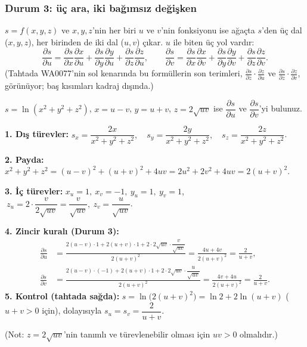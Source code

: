\subsubsection{Durum 3: üç ara, iki bağımsız değişken}
$s=f(x,y,z)$ ve $x,y,z$'nin her biri $u$ ve $v$'nin fonksiyonu ise ağaçta $s$'den üç dal ($x,y,z$), her birinden de iki
dal ($u,v$) çıkar. $u$ ile biten üç yol vardır:
\[
\frac{\partial s}{\partial u}=\frac{\partial s}{\partial x}\frac{\partial x}{\partial u}+\frac{\partial s}{\partial y}\frac{\partial y}{\partial u}+\frac{\partial s}{\partial z}\frac{\partial z}{\partial u},\qquad
\frac{\partial s}{\partial v}=\frac{\partial s}{\partial x}\frac{\partial x}{\partial v}+\frac{\partial s}{\partial y}\frac{\partial y}{\partial v}+\frac{\partial s}{\partial z}\frac{\partial z}{\partial v}.
\]
(Tahtada WA0077'nin sol kenarında bu formüllerin son terimleri, $\frac{\partial s}{\partial z}\cdot\frac{\partial z}{\partial u}$
ve $\frac{\partial s}{\partial z}\cdot\frac{\partial z}{\partial v}$, görünüyor; baş kısımları kadraj dışında.)

\begin{soru}
$s=\ln(x^2+y^2+z^2)$, $x=u-v$, $y=u+v$, $z=2\sqrt{uv}$ ise $\dfrac{\partial s}{\partial u}$ ve $\dfrac{\partial s}{\partial v}$'yi bulunuz.
\end{soru}
\begin{cevap}
\textbf{1. Dış türevler:}
$s_x=\dfrac{2x}{x^2+y^2+z^2},\quad s_y=\dfrac{2y}{x^2+y^2+z^2},\quad s_z=\dfrac{2z}{x^2+y^2+z^2}$.

\textbf{2. Payda:}
$x^2+y^2+z^2=(u-v)^2+(u+v)^2+4uv=2u^2+2v^2+4uv=2(u+v)^2$.

\textbf{3. İç türevler:} $x_u=1,\ x_v=-1,\ y_u=1,\ y_v=1$,
$\ z_u=2\cdot\dfrac{v}{2\sqrt{uv}}=\dfrac{v}{\sqrt{uv}},\ z_v=\dfrac{u}{\sqrt{uv}}$.

\textbf{4. Zincir kuralı (Durum 3):}
\begin{align*}
\frac{\partial s}{\partial u}&=\frac{2(u-v)\cdot1+2(u+v)\cdot1+2\cdot2\sqrt{uv}\cdot\dfrac{v}{\sqrt{uv}}}{2(u+v)^2}
=\frac{4u+4v}{2(u+v)^2}=\boxed{\frac{2}{u+v}},\\[4pt]
\frac{\partial s}{\partial v}&=\frac{2(u-v)\cdot(-1)+2(u+v)\cdot1+2\cdot2\sqrt{uv}\cdot\dfrac{u}{\sqrt{uv}}}{2(u+v)^2}
=\frac{4v+4u}{2(u+v)^2}=\boxed{\frac{2}{u+v}}.
\end{align*}
\textbf{5. Kontrol (tahtada sağda):} $s=\ln\big(2(u+v)^2\big)=\ln2+2\ln(u+v)$ ($u+v>0$ için), dolayısıyla
$s_u=s_v=\dfrac{2}{u+v}$. \checkmark

(Not: $z=2\sqrt{uv}$'nin tanımlı ve türevlenebilir olması için $uv>0$ olmalıdır.)
\end{cevap}

